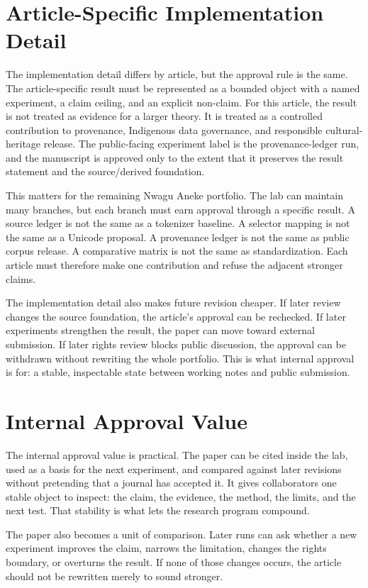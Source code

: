 \documentclass[sigconf,nonacm]{acmart}
\begin{document}
\section{Article-Specific Implementation Detail}
The implementation detail differs by article, but the approval rule is the same.
The article-specific result must be represented as a bounded object with a named
experiment, a claim ceiling, and an explicit non-claim. For this article, the
result is not treated as evidence for a larger theory. It is treated as a
controlled contribution to provenance, Indigenous data governance, and responsible cultural-heritage release. The public-facing experiment label is the provenance-ledger run, and the manuscript is approved only to the extent that it preserves the result
statement and the source/derived foundation.

This matters for the remaining Nwagu Aneke portfolio. The lab can maintain many
branches, but each branch must earn approval through a specific result. A source
ledger is not the same as a tokenizer baseline. A selector mapping is not the
same as a Unicode proposal. A provenance ledger is not the same as public corpus
release. A comparative matrix is not the same as standardization. Each article
must therefore make one contribution and refuse the adjacent stronger claims.

The implementation detail also makes future revision cheaper. If later review
changes the source foundation, the article's approval can be rechecked. If later
experiments strengthen the result, the paper can move toward external
submission. If later rights review blocks public discussion, the approval can be
withdrawn without rewriting the whole portfolio. This is what internal approval
is for: a stable, inspectable state between working notes and public submission.

\section{Internal Approval Value}
The internal approval value is practical. The paper can be cited inside the lab,
used as a basis for the next experiment, and compared against later revisions
without pretending that a journal has accepted it. It gives collaborators one
stable object to inspect: the claim, the evidence, the method, the limits, and
the next test. That stability is what lets the research program compound.

The paper also becomes a unit of comparison. Later runs can ask whether a new
experiment improves the claim, narrows the limitation, changes the rights
boundary, or overturns the result. If none of those changes occurs, the article
should not be rewritten merely to sound stronger.
\end{document}

